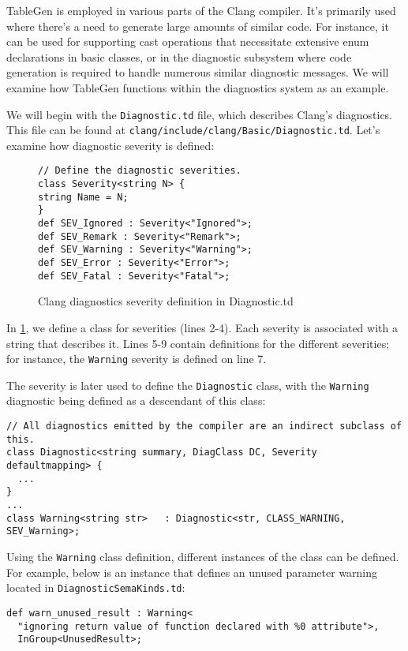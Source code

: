 TableGen is employed in various parts of the Clang compiler. It's primarily used
where there's a need to generate large amounts of similar code. For instance, it
can be used for supporting cast operations that necessitate extensive enum
declarations in basic classes, or in the diagnostic subsystem where code
generation is required to handle numerous similar diagnostic messages. We will
examine how TableGen functions within the diagnostics system as an example. 

We will begin with the \texttt{Diagnostic.td} file, which describes Clang's
diagnostics. This file can be found at
\texttt{clang/include/clang/Basic/Diagnostic.td}. Let's examine how diagnostic
severity is defined: 

\begin{figure}[H]
\begin{verbatim}
// Define the diagnostic severities.
class Severity<string N> {
string Name = N;
}
def SEV_Ignored : Severity<"Ignored">;
def SEV_Remark : Severity<"Remark">;
def SEV_Warning : Severity<"Warning">;
def SEV_Error : Severity<"Error">;
def SEV_Fatal : Severity<"Fatal">;
\end{verbatim}
\caption{Clang diagnostics severity definition in Diagnostic.td}
\label{lis:ch4:diagnostic_td}
\end{figure}

In \cref{lis:ch4:diagnostic_td}, we define a class for severities (lines
2-4). Each severity is associated with a string that describes it. Lines 5-9
contain definitions for the different severities; for instance, the
\texttt{Warning} severity is defined on line 7.

The severity is later used to define the \texttt{Diagnostic} class, 
with the \texttt{Warning} diagnostic being defined as a descendant of
this class:
\begin{verbatim}
// All diagnostics emitted by the compiler are an indirect subclass of this.
class Diagnostic<string summary, DiagClass DC, Severity defaultmapping> {
  ...
}
...
class Warning<string str>   : Diagnostic<str, CLASS_WARNING, SEV_Warning>;
\end{verbatim}

Using the \texttt{Warning} class definition, different
instances of the class can be defined. For example, below is an instance 
that defines an unused parameter warning located in \texttt{DiagnosticSemaKinds.td}:
\begin{verbatim}  
def warn_unused_result : Warning<
  "ignoring return value of function declared with %0 attribute">,
  InGroup<UnusedResult>;
\end{verbatim}

